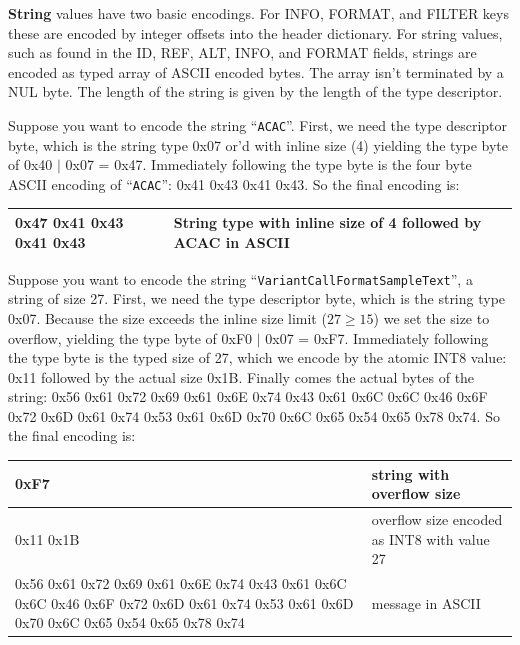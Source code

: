 \documentclass[8pt]{article}
\begin{document}
\vspace{0.3cm}
\textbf{String} values have two basic encodings.
For INFO, FORMAT, and FILTER keys these are encoded by integer offsets into the header dictionary.
For string values, such as found in the ID, REF, ALT, INFO, and FORMAT fields, strings are encoded as typed array of ASCII encoded bytes.
The array isn't terminated by a NUL byte.
The length of the string is given by the length of the type descriptor.

Suppose you want to encode the string ``{\tt ACAC}''.
First, we need the type descriptor byte, which is the string type 0x07 or'd with inline size (4) yielding the type byte of 0x40 $|$ 0x07 = 0x47.
Immediately following the type byte is the four byte ASCII encoding of ``{\tt ACAC}'': 0x41 0x43 0x41 0x43.
So the final encoding is:

\vspace{0.1cm}
\begin{tabular}{| l | l |} \hline
0x47 0x41 0x43 0x41 0x43 & String type with inline size of 4 followed by ACAC in ASCII \\ \hline
\end{tabular}
\vspace{0.3cm}

Suppose you want to encode the string ``{\tt VariantCallFormatSampleText}'', a string of size 27.
First, we need the type descriptor byte, which is the string type 0x07.
Because the size exceeds the inline size limit ($27 \geq 15$) we set the size to overflow, yielding the type byte of 0xF0 $|$ 0x07 = 0xF7.
Immediately following the type byte is the typed size of 27, which we encode by the atomic INT8 value: 0x11 followed by the actual size 0x1B.
Finally comes the actual bytes of the string: 0x56 0x61 0x72 0x69 0x61 0x6E 0x74 0x43 0x61 0x6C 0x6C 0x46 0x6F 0x72 0x6D 0x61 0x74 0x53 0x61 0x6D 0x70 0x6C 0x65 0x54 0x65 0x78 0x74.
So the final encoding is:

\vspace{0.3cm}
\begin{tabular}{ | p{9cm} | p{6cm} | } \hline
0xF7 & string with overflow size \\ \hline
0x11 0x1B & overflow size encoded as INT8 with value 27 \\ \hline
0x56 0x61 0x72 0x69 0x61 0x6E 0x74 0x43 0x61 0x6C 0x6C 0x46 0x6F 0x72 0x6D 0x61 0x74 0x53 0x61 0x6D 0x70 0x6C 0x65 0x54 0x65 0x78 0x74 & message in ASCII \\ \hline
\end{tabular}
\vspace{0.3cm}
\end{document}
